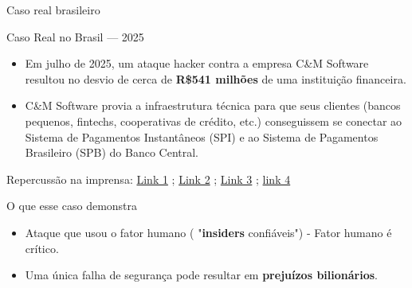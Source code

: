 \begin{frame}{Caso real brasileiro}

    \begin{block}{Caso Real no Brasil — 2025}
        \begin{itemize}
            \item Em julho de 2025, um ataque hacker contra a empresa C\&M Software resultou no desvio de cerca de \textbf{R\$541 milhões} de uma instituição financeira.

            \item C\&M Software provia a infraestrutura técnica para que seus clientes (bancos pequenos, fintechs, cooperativas de crédito, etc.) conseguissem se conectar ao Sistema de Pagamentos Instantâneos (SPI) e ao Sistema de Pagamentos Brasileiro (SPB) do Banco Central.
        \end{itemize}

    \end{block}

    \begin{block}{Repercussão na imprensa:}
        \href{https://www.cnnbrasil.com.br/nacional/brasil/ataque-hacker-o-que-sabemos-sobre-golpe-que-desviou-r-541-milhoes/}{Link 1} ;
        \href{https://g1.globo.com/sp/sao-paulo/noticia/2025/07/04/ataque-hacker-quem-e-suspeito-de-entregar-acesso-ao-sistema-que-liga-bancos-do-pix.ghtml}{Link 2} ;
        \href{https://cryptoid.com.br/ciberseguranca-seguranca-da-informacao/chaves-em-maos-erradas-licoes-do-maior-ataque-hacker-ao-sistema-financeiro/}{Link 3} ;
        \href{https://exame.com/insight/a-vida-apos-o-ataque-hacker-a-bmp-perdeu-r-500-milhoes-mas-resistiu-e-vai-virar-banco-multiplo/p}{link 4}

    \end{block}

    \begin{alertblock}{O que esse caso demonstra}
        \begin{itemize}
            \item Ataque que usou o fator humano ( "\textbf{insiders} confiáveis") - Fator humano é crítico.
            \item Uma única falha de segurança pode resultar em \textbf{prejuízos bilionários}.
        \end{itemize}
    \end{alertblock}

\end{frame}


